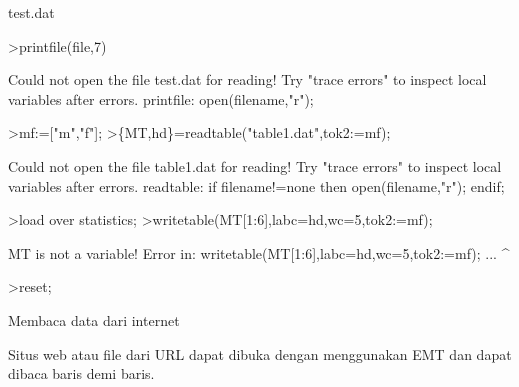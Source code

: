 \documentclass[a4paper,10pt]{article}
\begin{document}
\begin{eulernotebook}
\begin{eulercomment}
\begin{eulercomment}
\begin{eulercomment}
\begin{eulercomment}
\begin{eulercomment}
\begin{eulercomment}
\begin{eulercomment}
\begin{eulercomment}
\begin{eulercomment}
\begin{eulercomment}
\begin{euleroutput}
  test.dat
\end{euleroutput}
\begin{eulerprompt}
>printfile(file,7)
\end{eulerprompt}
\begin{euleroutput}
  Could not open the file
  test.dat
  for reading!
  Try "trace errors" to inspect local variables after errors.
  printfile:
      open(filename,"r");
\end{euleroutput}
\begin{eulerprompt}
>mf:=["m","f"];
>\{MT,hd\}=readtable("table1.dat",tok2:=mf);
\end{eulerprompt}
\begin{euleroutput}
  Could not open the file
  table1.dat
  for reading!
  Try "trace errors" to inspect local variables after errors.
  readtable:
      if filename!=none then open(filename,"r"); endif;
\end{euleroutput}
\begin{eulerprompt}
>load over statistics;
>writetable(MT[1:6],labc=hd,wc=5,tok2:=mf);
\end{eulerprompt}
\begin{euleroutput}
  MT is not a variable!
  Error in:
  writetable(MT[1:6],labc=hd,wc=5,tok2:=mf); ...
                    ^
\end{euleroutput}
\begin{eulerprompt}
>reset;
\end{eulerprompt}
\begin{eulercomment}
\begin{eulercomment}
\begin{eulercomment}
Membaca data dari internet

Situs web atau file dari URL dapat dibuka dengan menggunakan EMT dan
dapat dibaca baris demi baris.


\end{eulercomment}
\end{eulercomment}
\end{eulercomment}
\end{eulercomment}
\end{eulercomment}
\end{eulercomment}
\end{eulercomment}
\end{eulercomment}
\end{eulercomment}
\end{eulercomment}
\end{eulercomment}
\end{eulercomment}
\end{eulercomment}
\end{eulernotebook}
\end{document}
